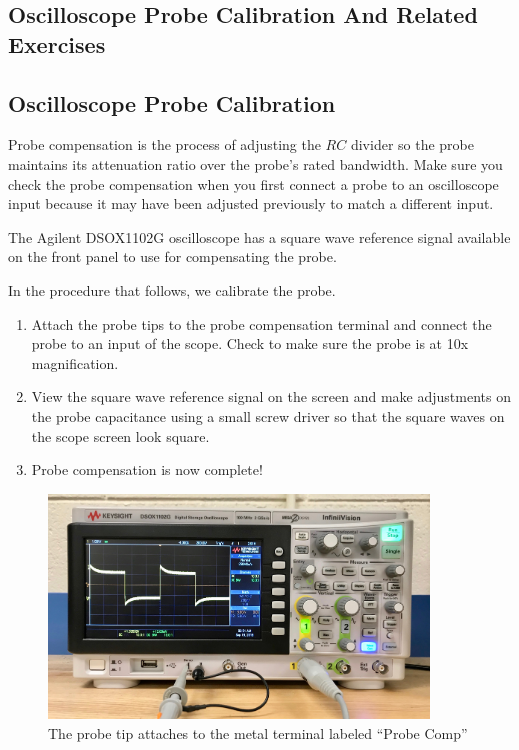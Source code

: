 \documentclass[12pt]{../manual}
\begin{document}
\newpage
\begin{appendices}
\section{Oscilloscope Probe Calibration And Related Exercises}
\subsection{Oscilloscope Probe Calibration}
Probe compensation is the process of adjusting the $RC$ divider so the probe maintains its attenuation ratio over the probe's rated bandwidth. Make sure you check the probe compensation when you first connect a probe to an oscilloscope input because it may have been adjusted previously to match a different input.   

The Agilent DSOX1102G oscilloscope has a square wave reference signal available on the front panel to use for compensating the probe.

In the procedure that follows, we calibrate the probe.
\begin{enumerate}
\item Attach the probe tips to the probe compensation terminal and connect the probe to an input of the scope. Check to make sure the probe is at 10x magnification.
\item View the square wave reference signal on the screen and make adjustments on the probe capacitance using a small screw driver so that the square waves on the scope screen look square.
\item Probe compensation is now complete!
\end{enumerate}

\begin{figure}[ht!]
\begin{center}
\centering
\includegraphics[width=0.9\textwidth]{figures/OscProbeComp.jpeg}
\caption[Oscilloscope Probe Calibration]{The probe tip attaches to the metal terminal labeled ``Probe Comp''}
\label{fig:oscprobecomp}
\end{center}
\end{figure}


\end{appendices}
\end{document}
